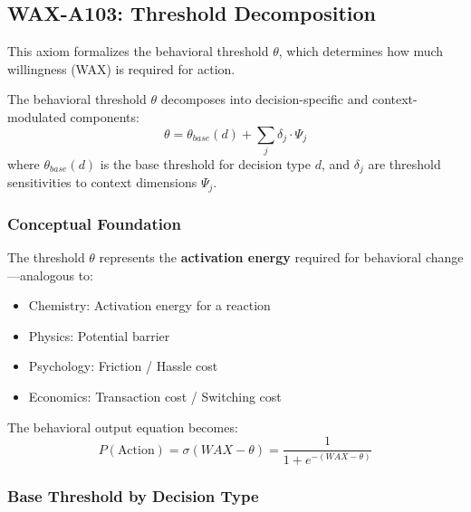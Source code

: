 
\subsection{WAX-A103: Threshold Decomposition}
\label{sec:wax-a103}

This axiom formalizes the behavioral threshold $\theta$, which determines how much willingness (WAX) is required for action.

\begin{axiom}
\label{ax:threshold}
The behavioral threshold $\theta$ decomposes into decision-specific and context-modulated components:
\begin{equation}
\theta = \theta_{base}(d) + \sum_{j} \delta_j \cdot \Psi_j
\end{equation}
where $\theta_{base}(d)$ is the base threshold for decision type $d$, and $\delta_j$ are threshold sensitivities to context dimensions $\Psi_j$.
\end{axiom}

\subsubsection{Conceptual Foundation}

The threshold $\theta$ represents the \textbf{activation energy} required for behavioral change---analogous to:
\begin{itemize}
\item Chemistry: Activation energy for a reaction
\item Physics: Potential barrier
\item Psychology: Friction / Hassle cost
\item Economics: Transaction cost / Switching cost
\end{itemize}

The behavioral output equation becomes:
\begin{equation}
P(\text{Action}) = \sigma(WAX - \theta) = \frac{1}{1 + e^{-(WAX - \theta)}}
\end{equation}

\subsubsection{Base Threshold by Decision Type}

